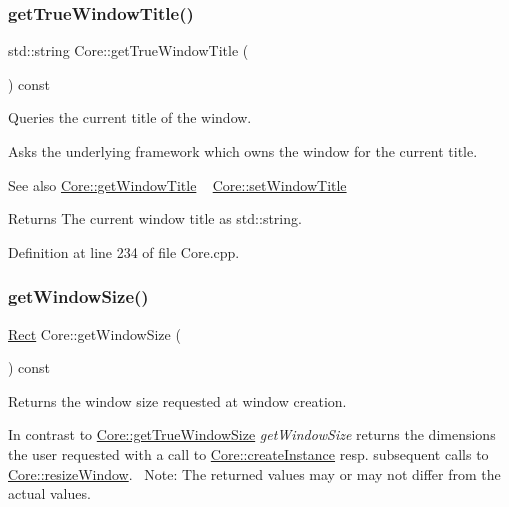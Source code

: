 \subsubsection{\texorpdfstring{get\+True\+Window\+Title()}{getTrueWindowTitle()}}
{\footnotesize\ttfamily std\+::string Core\+::get\+True\+Window\+Title (\begin{DoxyParamCaption}{ }\end{DoxyParamCaption}) const}



Queries the current title of the window. 

Asks the underlying framework which owns the window for the current title.

\begin{DoxySeeAlso}{See also}
\hyperlink{classbkengine_1_1Core_a0c42cf916f6232e384ea6d7f326becd9}{Core\+::get\+Window\+Title} ~\newline
 \hyperlink{classbkengine_1_1Core_a6c510c45e9463399359664965918b431}{Core\+::set\+Window\+Title} 
\end{DoxySeeAlso}
\begin{DoxyReturn}{Returns}
The current window title as std\+::string. 
\end{DoxyReturn}


Definition at line 234 of file Core.\+cpp.

\mbox{\label{classbkengine_1_1Core_a92e101c1e579bd2bc7fee001de816d6f}} 
\subsubsection{\texorpdfstring{get\+Window\+Size()}{getWindowSize()}}
{\footnotesize\ttfamily \hyperlink{structbkengine_1_1Rect}{Rect} Core\+::get\+Window\+Size (\begin{DoxyParamCaption}{ }\end{DoxyParamCaption}) const}



Returns the window size requested at window creation. 

In contrast to \hyperlink{classbkengine_1_1Core_a5238bcd142db1cb5a15cd3d6733a92da}{Core\+::get\+True\+Window\+Size} {\itshape get\+Window\+Size} returns the dimensions the user requested with a call to \hyperlink{classbkengine_1_1Core_a8b809ebbd1348ae9b59d49388e7a18f0}{Core\+::create\+Instance} resp. subsequent calls to \hyperlink{classbkengine_1_1Core_a88b8c671689df472845515953b5b7b2d}{Core\+::resize\+Window}.~\newline
Note\+: The returned values may or may not differ from the actual values.

